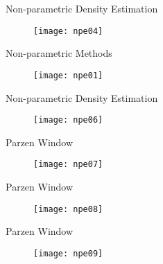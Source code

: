 \begin{frame}{Non-parametric Density Estimation}
\begin{figure}
\texttt{[image: npe04]}
\end{figure}
\end{frame}

\begin{frame}{Non-parametric Methods}
\begin{figure}
\texttt{[image: npe01]}
\end{figure}
\end{frame}



\begin{frame}{Non-parametric Density Estimation}
\vspace{-0.5cm}
\begin{figure}
\texttt{[image: npe06]}
\end{figure}
\end{frame}

\begin{frame}{Parzen Window}
\begin{figure}
\texttt{[image: npe07]}
\end{figure}
\end{frame}

\begin{frame}{Parzen Window}
\vspace{-0.5cm}
\begin{figure}
\texttt{[image: npe08]}
\end{figure}
\end{frame}

\begin{frame}{Parzen Window}
\vspace{-0.5cm}
\begin{figure}
\texttt{[image: npe09]}
\end{figure}
\end{frame}

